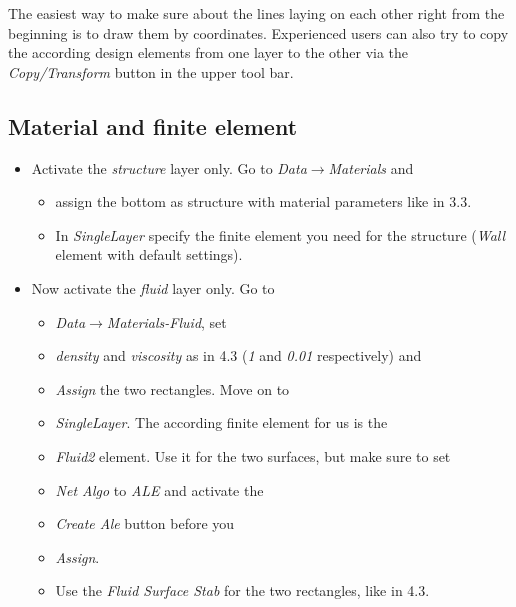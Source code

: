 The easiest way to make sure about the lines laying on each other
right from the beginning is to draw them by coordinates. Experienced
users can also try to copy the according design elements from one
layer to the other via the \emph{Copy/Transform} button in the upper
tool bar.


\subsection{Material and finite element}

\begin{itemize}
\item Activate the \emph{structure} layer only. Go to \emph{Data$\to$Materials}
and

\begin{itemize}
\item assign the bottom as structure with material parameters like in 3.3.
\item In \emph{SingleLayer} specify the finite element you need for the
structure (\emph{Wall} element with default settings).
\end{itemize}
\item Now activate the \emph{fluid} layer only. Go to

\begin{itemize}
\item \emph{Data$\to$Materials-Fluid}, set
\item \emph{density} and \emph{viscosity} as in 4.3 (\emph{1} and \emph{0.01} respectively) and
\item \emph{Assign} the two rectangles. Move on to
\item \emph{SingleLayer}. The according finite element for us is the
\item \emph{Fluid2} element. Use it for the two surfaces, but make sure
to set
\item \emph{Net Algo} to \emph{ALE} and activate the
\item \emph{Create Ale} button before you
\item \emph{Assign}.
\item Use the \emph{Fluid Surface Stab} for the two rectangles, like in
4.3.
\end{itemize}


\end{itemize}
